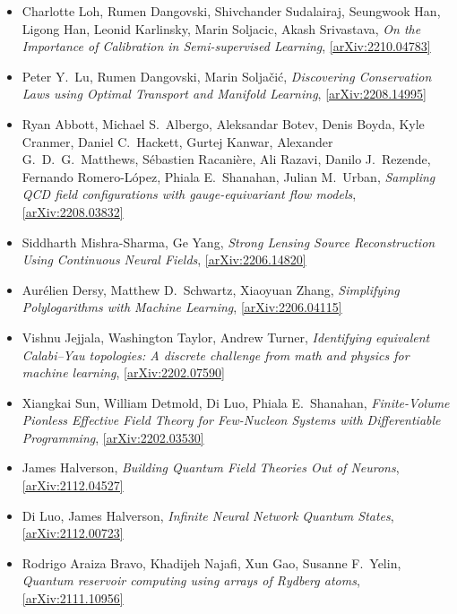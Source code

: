 \begin{itemize}
\item Charlotte Loh, Rumen Dangovski, Shivchander Sudalairaj, Seungwook Han, Ligong Han, Leonid Karlinsky, Marin Soljacic, Akash Srivastava, \textit{On the Importance of Calibration in Semi-supervised Learning}, \href{https://arxiv.org/abs/2210.04783}{[arXiv:2210.04783]} 
\item Peter Y.\  Lu, Rumen Dangovski, Marin Soljačić, \textit{Discovering Conservation Laws using Optimal Transport and Manifold Learning}, \href{https://arxiv.org/abs/2208.14995}{[arXiv:2208.14995]} 
\item Ryan Abbott, Michael S.\  Albergo, Aleksandar Botev, Denis Boyda, Kyle Cranmer, Daniel C.\  Hackett, Gurtej Kanwar, Alexander G.\  D.\  G.\  Matthews, Sébastien Racanière, Ali Razavi, Danilo J.\  Rezende, Fernando Romero-López, Phiala E.\  Shanahan, Julian M.\  Urban, \textit{Sampling QCD field configurations with gauge-equivariant flow models}, \href{https://arxiv.org/abs/2208.03832}{[arXiv:2208.03832]} 
\item Siddharth Mishra-Sharma, Ge Yang, \textit{Strong Lensing Source Reconstruction Using Continuous Neural Fields}, \href{https://arxiv.org/abs/2206.14820}{[arXiv:2206.14820]} 
\item Aurélien Dersy, Matthew D.\  Schwartz, Xiaoyuan Zhang, \textit{Simplifying Polylogarithms with Machine Learning}, \href{https://arxiv.org/abs/2206.04115}{[arXiv:2206.04115]} 
\item Vishnu Jejjala, Washington Taylor, Andrew Turner, \textit{Identifying equivalent Calabi--Yau topologies: A discrete challenge from math and physics for machine learning}, \href{https://arxiv.org/abs/2202.07590}{[arXiv:2202.07590]} 
\item Xiangkai Sun, William Detmold, Di Luo, Phiala E.\  Shanahan, \textit{Finite-Volume Pionless Effective Field Theory for Few-Nucleon Systems with Differentiable Programming}, \href{https://arxiv.org/abs/2202.03530}{[arXiv:2202.03530]} 
\item James Halverson, \textit{Building Quantum Field Theories Out of Neurons}, \href{https://arxiv.org/abs/2112.04527}{[arXiv:2112.04527]} 
\item Di Luo, James Halverson, \textit{Infinite Neural Network Quantum States}, \href{https://arxiv.org/abs/2112.00723}{[arXiv:2112.00723]} 
\item Rodrigo Araiza Bravo, Khadijeh Najafi, Xun Gao, Susanne F.\  Yelin, \textit{Quantum reservoir computing using arrays of Rydberg atoms}, \href{https://arxiv.org/abs/2111.10956}{[arXiv:2111.10956]} 

\end{itemize}
